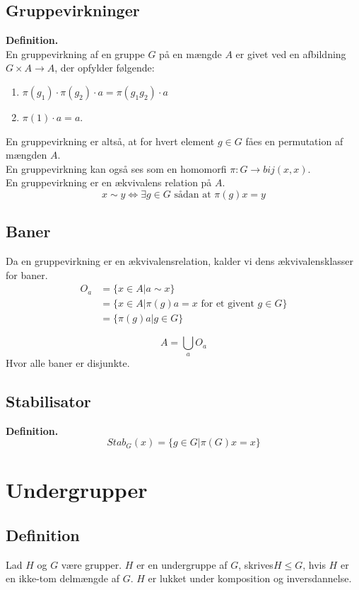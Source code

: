 \documentclass[11pt]{article}
\begin{document}
\subsection*{Gruppevirkninger}
\textbf{Definition.}\\
En gruppevirkning af en gruppe $G$ på en mængde $A$ er givet ved en afbildning $G \times A \to A$, der opfylder følgende:\\
\begin{enumerate}
  \item $\pi(g_1) \cdot \pi(g_2) \cdot a = \pi(g_1 g_2) \cdot a$\\
  \item $\pi(1) \cdot a = a$.
\end{enumerate}
En gruppevirkning er altså, at for hvert element $g \in G$ fåes en permutation af mængden $A$.\\
En gruppevirkning kan også ses som en homomorfi $\pi : G \to bij(x,x)$.\\
En gruppevirkning er en ækvivalens relation på $A$.\\
$$x \sim y \iff \exists{g \in G} \text{ sådan at } \pi(g)x = y$$

\subsection*{Baner}
Da en gruppevirkning er en ækvivalensrelation, kalder vi dens ækvivalensklasser for baner.\\
\begin{align*}
  O_a &= \{ x \in A | a \sim x \}\\
  &= \{ x \in A | \pi(g)a = x \text{ for et givent } g \in G \}\\
  &= \{ \pi(g)a | g \in G \}
\end{align*}

$$A = \bigcup_a O_a$$
Hvor alle baner er disjunkte.

\subsection*{Stabilisator}
\textbf{Definition.}\\
$$Stab_G(x) = \{ g \in G | \pi(G)x = x \}$$
\section*{Undergrupper}

\subsection*{Definition}
Lad $H$ og $G$ være grupper. $H$ er en undergruppe af $G$, skrives$H \leq G$, hvis $H$ er en ikke-tom delmængde af $G$. $H$ er lukket under komposition og inversdannelse.
\end{document}
